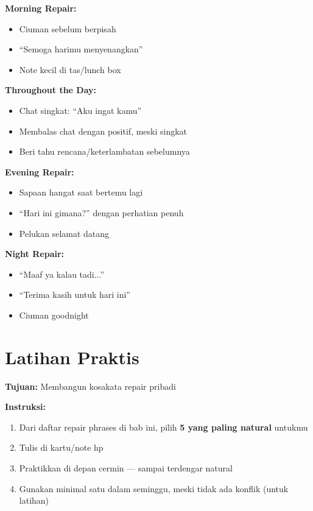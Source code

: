 \begin{tipbox}
\textbf{Morning Repair:}
\begin{itemize}
    \item Ciuman sebelum berpisah
    \item ``Semoga harimu menyenangkan''
    \item Note kecil di tas/lunch box
\end{itemize}

\textbf{Throughout the Day:}
\begin{itemize}
    \item Chat singkat: ``Aku ingat kamu''
    \item Membalas chat dengan positif, meski singkat
    \item Beri tahu rencana/keterlambatan sebelumnya
\end{itemize}

\textbf{Evening Repair:}
\begin{itemize}
    \item Sapaan hangat saat bertemu lagi
    \item ``Hari ini gimana?'' dengan perhatian penuh
    \item Pelukan selamat datang
\end{itemize}

\textbf{Night Repair:}
\begin{itemize}
    \item ``Maaf ya kalau tadi...''
    \item ``Terima kasih untuk hari ini''
    \item Ciuman goodnight
\end{itemize}
\end{tipbox}

\section{Latihan Praktis}

\begin{exercisebox}
\textbf{Tujuan:} Membangun kosakata repair pribadi

\textbf{Instruksi:}
\begin{enumerate}
    \item Dari daftar repair phrases di bab ini, pilih \textbf{5 yang paling natural} untukmu
    \item Tulis di kartu/note hp
    \item Praktikkan di depan cermin --- sampai terdengar natural
    \item Gunakan minimal satu dalam seminggu, meski tidak ada konflik (untuk latihan)
\end{enumerate}
\end{exercisebox}

